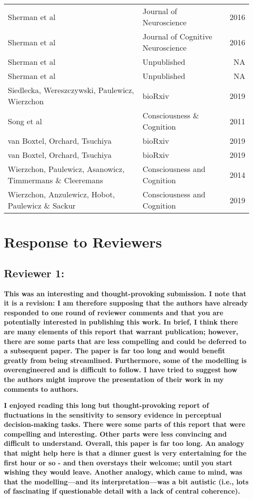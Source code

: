 \documentclass[
]{article}
\begin{document}
\begin{longtable}[t]{llr}
Sherman et al & Journal of Neuroscience & 2016\\
Sherman et al & Journal of Cognitive Neuroscience & 2016\\
Sherman et al & Unpublished & NA\\
Sherman et al & Unpublished & NA\\
\addlinespace
Siedlecka, Wereszczywski, Paulewicz, Wierzchon & bioRxiv & 2019\\
Song et al & Consciousness \& Cognition & 2011\\
van Boxtel, Orchard, Tsuchiya & bioRxiv & 2019\\
van Boxtel, Orchard, Tsuchiya & bioRxiv & 2019\\
Wierzchon, Paulewicz, Asanowicz, Timmermans \& Cleeremans & Consciousness and Cognition & 2014\\
\addlinespace
Wierzchon, Anzulewicz, Hobot, Paulewicz \& Sackur & Consciousness and Cognition & 2019\\*
\end{longtable}
\endgroup{}

\newpage

\hypertarget{response-to-reviewers}{%
\section{Response to Reviewers}\label{response-to-reviewers}}

\hypertarget{reviewer-1}{%
\subsection{Reviewer 1:}\label{reviewer-1}}

\textbf{This was an interesting and thought-provoking submission. I note
that it is a revision: I am therefore supposing that the authors have
already responded to one round of reviewer comments and that you are
potentially interested in publishing this work. In brief, I think there
are many elements of this report that warrant publication; however,
there are some parts that are less compelling and could be deferred to a
subsequent paper. The paper is far too long and would benefit greatly
from being streamlined. Furthermore, some of the modelling is
overengineered and is difficult to follow. I have tried to suggest how
the authors might improve the presentation of their work in my comments
to authors.}

\textbf{I enjoyed reading this long but thought-provoking report of
fluctuations in the sensitivity to sensory evidence in perceptual
decision-making tasks. There were some parts of this report that were
compelling and interesting. Other parts were less convincing and
difficult to understand. Overall, this paper is far too long. An analogy
that might help here is that a dinner guest is very entertaining for the
first hour or so - and then overstays their welcome; until you start
wishing they would leave. Another analogy, which came to mind, was that
the modelling---and its interpretation---was a bit autistic (i.e., lots
of fascinating if questionable detail with a lack of central
coherence).}
\end{document}
